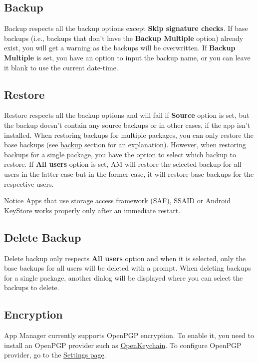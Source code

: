 \subsection{Backup}\label{subsec:backup-restore-backup}
Backup respects all the backup options except \textbf{Skip signature checks}. If base backups (i.e., backups that don't
have the \textbf{Backup Multiple} option) already exist, you will get a warning as the backups will be overwritten. If
\textbf{Backup Multiple} is set, you have an option to input the backup name, or you can leave it blank to use the
current date-time.

\subsection{Restore}\label{subsec:backup-restore-restore}
Restore respects all the backup options and will fail if \textbf{Source} option is set, but the backup doesn't contain
any source backups or in other cases, if the app isn't installed. When restoring backups for multiple packages, you can
only restore the base backups (see \hyperref[subsec:backup-restore-backup]{backup} section for an explanation). However,
when restoring backups for a single package, you have the option to select which backup to restore. If
\textbf{All users} option is set, AM will restore the selected backup for all users in the latter case but in the former
case, it will restore base backups for the respective users.

\begin{tip}{Notice}
    Apps that use storage access framework (SAF), SSAID or Android KeyStore works properly only after an immediate restart.
\end{tip}

\subsection{Delete Backup}\label{subsec:backup-restore-delete-backup}
Delete backup only respects \textbf{All users} option and when it is selected, only the base backups for all users will
be deleted with a prompt. When deleting backups for a single package, another dialog will be displayed where you can
select the backups to delete.

\subsection{Encryption}\label{subsec:backup-restore-encryption}
App Manager currently supports OpenPGP encryption. To enable it, you need to install an OpenPGP provider such as
\href{https://openkeychain.org}{OpenKeychain}. To configure OpenPGP provider, go to the
\hyperref[subsubsec:settings-encryption]{Settings page}.
